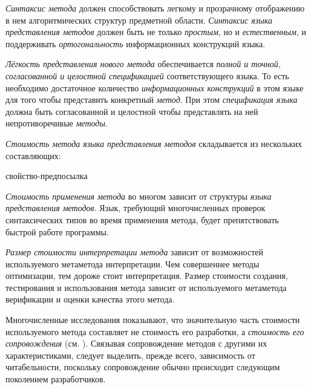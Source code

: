 \textit{Синтаксис метода} должен способствовать легкому и прозрачному отображению в нем алгоритмических структур предметной области. \textit{Синтаксис языка представления методов} должен быть не только \textit{простым}, но и \textit{естественным}, и поддерживать \textit{ортогональность} информационных конструкций языка.

\textit{Лёгкость представления нового метода} обеспечивается \textit{полной и точной, согласованной и целостной спецификацией} соответствующего языка. То есть необходимо достаточное количество \textit{информационных конструкций} в этом языке для того чтобы представить конкретный \textit{метод}. При этом \textit{спецификация языка} должна быть согласованной и целостной чтобы представлять на ней непротиворечивые \textit{методы}.

\textit{Стоимость метода языка представления методов} складывается из нескольких составляющих:

\begin{SCn}
\begin{scnrelfromlist}{свойство-предпосылка}
\end{scnrelfromlist}
\end{SCn}

\textit{Стоимость применения метода} во многом зависит от структуры \textit{языка представления методов}. Язык, требующий многочисленных проверок синтаксических типов во время применения метода, будет препятствовать быстрой работе программы.

\textit{Размер стоимости интерпретации метода} зависит от возможностей используемого метаметода интерпретации. Чем совершеннее методы оптимизации, тем дороже стоит интерпретация.
Размер стоимости создания, тестирования и использования метода зависит от используемого метаметода верификации и оценки качества этого метода.

Многочисленные исследования показывают, что значительную часть стоимости используемого метода составляет не стоимость его разработки, а \textit{стоимость его сопровождения} (см. ). Связывая сопровождение методов с другими их характеристиками, следует выделить, прежде всего, зависимость от читабельности, поскольку сопровождение обычно происходит следующим поколением разработчиков.

